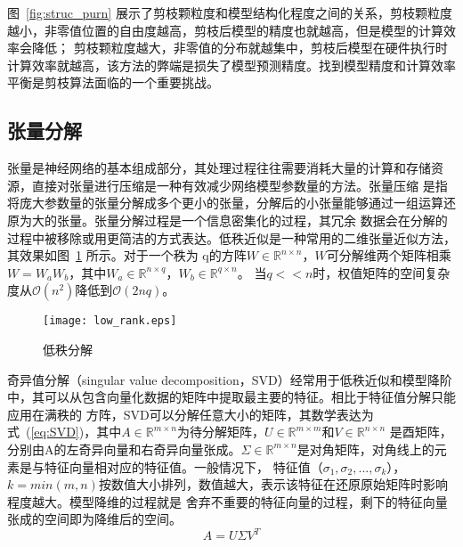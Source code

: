 图~\ref{fig:struc_purn} 展示了剪枝颗粒度和模型结构化程度之间的关系，剪枝颗粒度越小，非零值位置的自由度越高，剪枝后模型的精度也就越高，但是模型的计算效率会降低；
剪枝颗粒度越大，非零值的分布就越集中，剪枝后模型在硬件执行时计算效率就越高，该方法的弊端是损失了模型预测精度。找到模型精度和计算效率平衡是剪枝算法面临的一个重要挑战。


\subsection{张量分解}
张量是神经网络的基本组成部分，其处理过程往往需要消耗大量的计算和存储资源，直接对张量进行压缩是一种有效减少网络模型参数量的方法。张量压缩
是指将庞大参数量的张量分解成多个更小的张量，分解后的小张量能够通过一组运算还原为大的张量。张量分解过程是一个信息密集化的过程，其冗余
数据会在分解的过程中被移除或用更简洁的方式表达。低秩近似是一种常用的二维张量近似方法，其效果如图~\ref{fig:lowrank} 所示。对于一个秩为
q的方阵\(W \in \mathbb{R}^{n \times n}\)，\(W\)可分解维两个矩阵相乘\(W = W_a  W_b\)，其中\(W_a\in \mathbb{R}^{n \times q}\)，\(W_b \in \mathbb{R}^{q \times n}\)。
当\(q << n \)时，权值矩阵的空间复杂度从\(\mathcal{O}(n^2)\)降低到\(\mathcal{O}(2nq)\)。
\begin{figure}
	\centering
	\texttt{[image: low\_rank.eps]}
	\caption{低秩分解}
	\label{fig:lowrank}
\end{figure}

奇异值分解（singular value decomposition，SVD）经常用于低秩近似和模型降阶中，其可以从包含向量化数据的矩阵中提取最主要的特征。相比于特征值分解只能应用在满秩的
方阵，SVD可以分解任意大小的矩阵，其数学表达为式~(\ref{eq:SVD})，其中\(A \in \mathbb{R}^{m \times n}\)为待分解矩阵，\( U \in \mathbb{R}^{m \times m}\)和\( V \in \mathbb{R}^{n \times n}\)
是酉矩阵，分别由A的左奇异向量和右奇异向量张成。\(\Sigma \in \mathbb{R}^{m \times n}\)是对角矩阵，对角线上的元素是与特征向量相对应的特征值。一般情况下，
特征值（\(\sigma_1, \sigma_2,...,\sigma_k\)），\(k=min(m,n)\)按数值大小排列，数值越大，表示该特征在还原原始矩阵时影响程度越大。模型降维的过程就是
舍弃不重要的特征向量的过程，剩下的特征向量张成的空间即为降维后的空间。
\begin{equation}\label{eq:SVD}
	A = U  \Sigma   V^T
\end{equation}

